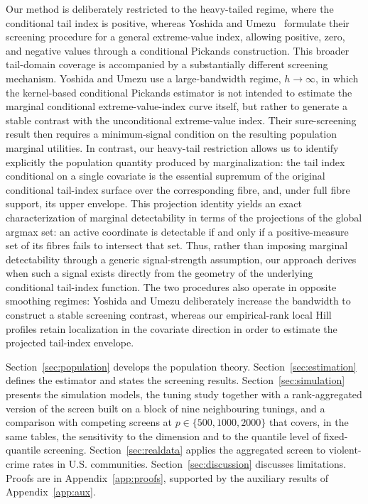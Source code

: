 Our method is deliberately restricted to the heavy-tailed regime, where the conditional tail index is positive, whereas Yoshida and Umezu~\cite{yoshidaUmezu2026} formulate their screening procedure for a general extreme-value index, allowing positive, zero, and negative values through a conditional Pickands construction. This broader tail-domain coverage is accompanied by a substantially different screening mechanism. Yoshida and Umezu use a large-bandwidth regime, $h\to\infty$, in which the kernel-based conditional Pickands estimator is not intended to estimate the marginal conditional extreme-value-index curve itself, but rather to generate a stable contrast with the unconditional extreme-value index. Their sure-screening result then requires a minimum-signal condition on the resulting population marginal utilities. In contrast, our heavy-tail restriction allows us to identify explicitly the population quantity produced by marginalization: the tail index conditional on a single covariate is the essential supremum of the original conditional tail-index surface over the corresponding fibre, and, under full fibre support, its upper envelope. This projection identity yields an exact characterization of marginal detectability in terms of the projections of the global argmax set: an active coordinate is detectable if and only if a positive-measure set of its fibres fails to intersect that set. Thus, rather than imposing marginal detectability through a generic signal-strength assumption, our approach derives when such a signal exists directly from the geometry of the underlying conditional tail-index function. The two procedures also operate in opposite smoothing regimes: Yoshida and Umezu deliberately increase the bandwidth to construct a stable screening contrast, whereas our empirical-rank local Hill profiles retain localization in the covariate direction in order to estimate the projected tail-index envelope.


Section~\ref{sec:population} develops the population theory.
Section~\ref{sec:estimation} defines the estimator and states the screening
results. Section~\ref{sec:simulation} presents the simulation models, the tuning
study together with a rank-aggregated version of the screen built on a
block of nine neighbouring tunings, and a comparison with competing
screens at $p\in\{500,1000,2000\}$ that covers, in the same tables, the
sensitivity to the dimension and to the quantile level of fixed-quantile
screening. Section~\ref{sec:realdata} applies the aggregated screen to
violent-crime rates in U.S. communities.
Section~\ref{sec:discussion} discusses limitations. Proofs are in
Appendix~\ref{app:proofs}, supported by the auxiliary results of
Appendix~\ref{app:aux}.
